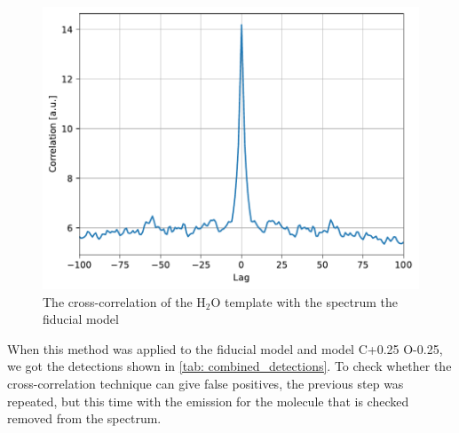 \documentclass[oneside, single, authoryear, semicolon, 12pt]{lion-msc}
\newcommand{\4}{$_4$}
\newcommand{\3}{$_3$}
\newcommand{\2}{$_2$}
\begin{document}
\begin{figure}[H]
    \centering
    \includegraphics[width=.5\linewidth]{Figures/Cross-Correlation.pdf}
    \caption{The cross-correlation of the H\2O template with the spectrum the fiducial model}
    \label{fig: crosscorr}
\end{figure}

When this method was applied to the fiducial model and model C+0.25 O-0.25, we got the detections shown in \autoref{tab: combined_detections}. To check whether the cross-correlation technique can give false positives, the previous step was repeated, but this time with the emission for the molecule that is checked removed from the spectrum.

\begin{table}[!ht]
\centering
{}
\caption{Molecular detections in the spectrum of the fiducial model (A) and the model with C+0.25 and O-0.25 (B) before and after subtracting molecular emission. A confirmed detection () indicates that the molecule is detected in the full spectrum. A molecular emission is considered present in the full spectrum when the integrated flux over the wavelength range is greater than the integrated flux of a flat continuum at 0.1 mJy over the wavelength range.}
\label{tab: combined_detections}
\end{table}
\end{document}
